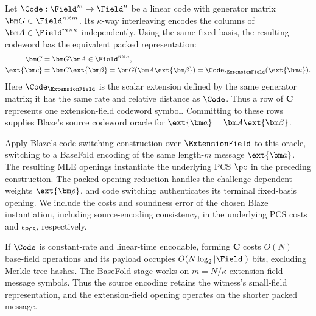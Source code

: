 Let \(\Code:\Field^m\to\Field^n\) be a linear code with
generator matrix \(\bm G\in\Field^{n\times m}\).
Its \(\kappa\)-way interleaving encodes the columns of
\(\bm A\in\Field^{m\times\kappa}\) independently.
Using the same fixed basis,
the resulting codeword has the equivalent packed representation:
\begin{equation}
\begin{aligned}
    \bm C&=\bm G\bm A\in\Field^{n\times\kappa},\\
    \ext{\bm c}&=\bm C\ext{\bm\beta}
       =\bm G(\bm A\ext{\bm\beta})
       =\Code_{\ExtensionField}(\ext{\bm a}).
\end{aligned}
\label{eq:pcs-code-packing}
\end{equation}
Here \(\Code_{\ExtensionField}\) is the scalar extension defined
by the same generator matrix; it has the same rate and relative
distance as \(\Code\).
Thus a row of \(\bm C\) represents one extension-field codeword
symbol. Committing to these rows supplies Blaze's source codeword
oracle for \(\ext{\bm a}=\bm A\ext{\bm\beta}\).

Apply Blaze's code-switching construction over \(\ExtensionField\)
to this oracle, switching to a BaseFold encoding of the same
length-\(m\) message \(\ext{\bm a}\).
The resulting MLE openings instantiate the underlying PCS \(\pc\)
in the preceding construction.
The packed opening reduction handles the challenge-dependent weights
\(\ext{\bm\rho}\), and code switching authenticates its terminal
fixed-basis opening. We include the costs and soundness error of
the chosen Blaze instantiation, including source-encoding
consistency, in the underlying PCS costs and
\(\epsilon_{\mathsf{PCS}}\), respectively.

If \(\Code\) is constant-rate and linear-time encodable, forming
\(\bm C\) costs \(O(N)\) base-field operations and its payload
occupies \(O(N\log_2|\Field|)\) bits, excluding Merkle-tree hashes.
The BaseFold stage works on \(m=N/\kappa\) extension-field message
symbols. Thus the source encoding retains the witness's small-field
representation, and the extension-field opening operates on the
shorter packed message.
